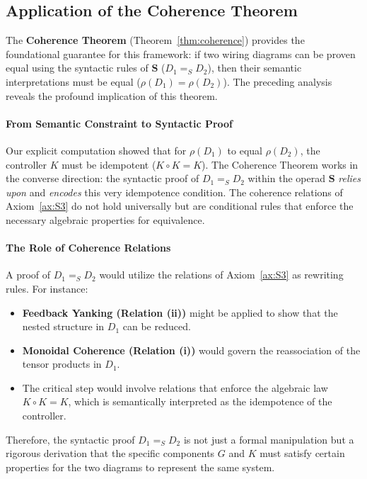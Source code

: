 \documentclass[11pt]{article}
\begin{document}
\subsection{Application of the Coherence Theorem}

The \textbf{Coherence Theorem} (Theorem~\ref{thm:coherence}) provides the foundational guarantee for this framework: if two wiring diagrams can be proven equal using the syntactic rules of $\mathbf{S}$ ($D_1 =_S D_2$), then their semantic interpretations must be equal ($\rho(D_1) = \rho(D_2)$). The preceding analysis reveals the profound implication of this theorem.

\paragraph{From Semantic Constraint to Syntactic Proof}
Our explicit computation showed that for $\rho(D_1)$ to equal $\rho(D_2)$, the controller $K$ must be idempotent ($K \circ K = K$). The Coherence Theorem works in the converse direction: the syntactic proof of $D_1 =_S D_2$ within the operad $\mathbf{S}$ \textit{relies upon} and \textit{encodes} this very idempotence condition. The coherence relations of Axiom~\ref{ax:S3} do not hold universally but are conditional rules that enforce the necessary algebraic properties for equivalence.

\paragraph{The Role of Coherence Relations}
A proof of $D_1 =_S D_2$ would utilize the relations of Axiom~\ref{ax:S3} as rewriting rules. For instance:
\begin{itemize}
    \item \textbf{Feedback Yanking (Relation (ii))} might be applied to show that the nested structure in $D_1$ can be reduced.
    \item \textbf{Monoidal Coherence (Relation (i))} would govern the reassociation of the tensor products in $D_1$.
    \item The critical step would involve relations that enforce the algebraic law $K \circ K = K$, which is semantically interpreted as the idempotence of the controller.
\end{itemize}
Therefore, the syntactic proof $D_1 =_S D_2$ is not just a formal manipulation but a rigorous derivation that the specific components $G$ and $K$ must satisfy certain properties for the two diagrams to represent the same system.
\end{document}

